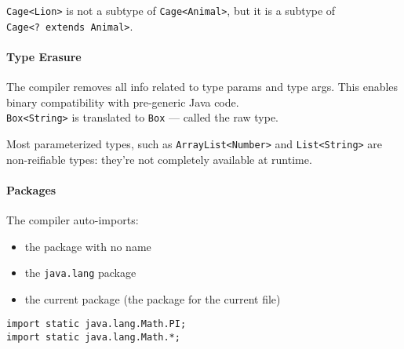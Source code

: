 \verb=Cage<Lion>= is not a subtype of \verb=Cage<Animal>=,
but it is a subtype of\\
\verb=Cage<? extends Animal>=.

\paragraph{Type Erasure}
The compiler removes all info related to type params and type args.
This enables binary compatibility with pre-generic Java code.\\
\verb=Box<String>= is translated to \verb=Box= --- called the raw type.

Most parameterized types, such as \verb=ArrayList<Number>= and
\verb=List<String>= are non-reifiable types:
they're not completely available at runtime.

\paragraph{Packages}
The compiler auto-imports:
\begin{itemize}
\item the package with no name
\item the \verb=java.lang= package
\item the current package (the package for the current file)
\end{itemize}

\begin{verbatim}
import static java.lang.Math.PI;
import static java.lang.Math.*;
\end{verbatim}
